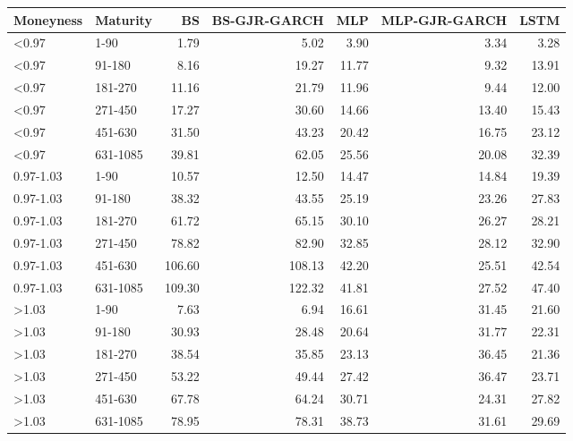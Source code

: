 \begin{tabular}{llrrrrr}
\toprule
Moneyness & Maturity & BS & BS-GJR-GARCH & MLP & MLP-GJR-GARCH & LSTM \\
\midrule
<0.97 & 1-90 & 1.79 & 5.02 & 3.90 & 3.34 & 3.28 \\
<0.97 & 91-180 & 8.16 & 19.27 & 11.77 & 9.32 & 13.91 \\
<0.97 & 181-270 & 11.16 & 21.79 & 11.96 & 9.44 & 12.00 \\
<0.97 & 271-450 & 17.27 & 30.60 & 14.66 & 13.40 & 15.43 \\
<0.97 & 451-630 & 31.50 & 43.23 & 20.42 & 16.75 & 23.12 \\
<0.97 & 631-1085 & 39.81 & 62.05 & 25.56 & 20.08 & 32.39 \\
0.97-1.03 & 1-90 & 10.57 & 12.50 & 14.47 & 14.84 & 19.39 \\
0.97-1.03 & 91-180 & 38.32 & 43.55 & 25.19 & 23.26 & 27.83 \\
0.97-1.03 & 181-270 & 61.72 & 65.15 & 30.10 & 26.27 & 28.21 \\
0.97-1.03 & 271-450 & 78.82 & 82.90 & 32.85 & 28.12 & 32.90 \\
0.97-1.03 & 451-630 & 106.60 & 108.13 & 42.20 & 25.51 & 42.54 \\
0.97-1.03 & 631-1085 & 109.30 & 122.32 & 41.81 & 27.52 & 47.40 \\
>1.03 & 1-90 & 7.63 & 6.94 & 16.61 & 31.45 & 21.60 \\
>1.03 & 91-180 & 30.93 & 28.48 & 20.64 & 31.77 & 22.31 \\
>1.03 & 181-270 & 38.54 & 35.85 & 23.13 & 36.45 & 21.36 \\
>1.03 & 271-450 & 53.22 & 49.44 & 27.42 & 36.47 & 23.71 \\
>1.03 & 451-630 & 67.78 & 64.24 & 30.71 & 24.31 & 27.82 \\
>1.03 & 631-1085 & 78.95 & 78.31 & 38.73 & 31.61 & 29.69 \\
\bottomrule
\end{tabular}
